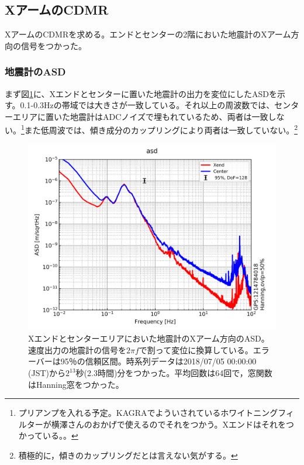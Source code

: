 \subsection{XアームのCDMR}
XアームのCDMRを求める。エンドとセンターの2階においた地震計のXアーム方向の信号をつかった。

\subsubsection{地震計のASD}
まず図\ref{img:img1}に、Xエンドとセンターに置いた地震計の出力を変位にしたASDを示す。0.1-0.3Hzの帯域では大きさが一致している。それ以上の周波数では、センターエリアに置いた地震計はADCノイズで埋もれているため、両者は一致しない。\footnote[6]{プリアンプを入れる予定。KAGRAでよういされているホワイトニングフィルターが横澤さんのおかげで使えるのでそれをつかう。Xエンドはそれをつかっている。。}また低周波では、傾き成分のカップリングにより両者は一致していない。\footnote[7]{積極的に，傾きのカップリングだとは言えない気がする。}

\begin{figure}[H]
  \begin{center}
    \includegraphics[width=11.5cm]{./cdmr/asd.png}
  \end{center}
  \caption{Xエンドとセンターエリアにおいた地震計のXアーム方向のASD。速度出力の地震計の信号を$2\pi{f}$で割って変位に換算している。エラーバーは95％の信頼区間。時系列データは2018/07/05 00:00:00 (JST)から$2^{13}$秒(2.3時間)分をつかった。平均回数は64回で，窓関数はHanning窓をつかった。}\label{img:img1}
\end{figure}


